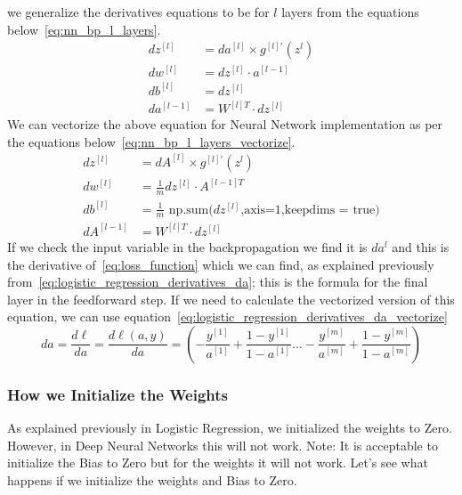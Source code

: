 we generalize the derivatives equations to be for $l$ layers from the equations below~\eqref{eq:nn_bp_l_layers}.%
%
\begin{subequations}\label{eq:nn_bp_l_layers}
  \begin{align}
   dz^{[l]} & = da^{[l]} \times g^{[l]'}(z^{l}) \\
   dw^{[l]} & = dz^{[l]} \cdot a^{[l-1]} \\
   db^{[l]} & = dz^{[l]} \\
   da^{[l-1]} & = W^{[l]T} \cdot dz^{[l]} %
 \end{align}
\end{subequations}%
We can vectorize the above equation for Neural Network implementation as per the equations below~\eqref{eq:nn_bp_l_layers_vectorize}.
 \begin{subequations}\label{eq:nn_bp_l_layers_vectorize}
  \begin{align}
   dz^{[l]} & = dA^{[l]} \times g^{[l]'}(z^{l}) \\
   dw^{[l]} & = \frac{1}{m} dz^{[l]} \cdot A^{[l-1]T} \\
   db^{[l]} & = \frac{1}{m} \text{ np.sum(}dz^{[l]}\text{,axis=1,keepdims = true)} \\
   dA^{[l-1]} & = W^{[l]T} \cdot dz^{[l]} %
 \end{align}
\end{subequations}%
%
If we check the input variable in the backpropagation we find it is $da^{l}$ and this is the derivative of~\eqref{eq:loss_function} which we can find, as explained previously from~\eqref{eq:logistic_regression_derivatives_da}; this is the formula for the final layer in the feedforward step. If we need to calculate the vectorized version of this equation, we can use equation~\eqref{eq:logistic_regression_derivatives_da_vectorize}
\begin{equation}\label{eq:logistic_regression_derivatives_da_vectorize}
da = \frac{d\ell}{da} = \frac{d\ell(a,y)}{da} = (- \frac{y^{[1]}}{a^{[1]}} + \frac{1-y^{[1]}}{1-a^{[1]}} \ldots - \frac{y^{[m]}}{a^{[m]}} + \frac{1-y^{[m]}}{1-a^{[m]}} )
\end{equation}%
%
\subsubsection{How we Initialize the Weights}
As explained previously in Logistic Regression, we initialized the weights to Zero. However, in Deep Neural Networks this will not work. Note: It is acceptable to initialize the Bias to Zero but for the weights it will not work. Let's see what happens if we initialize the weights and Bias to Zero. %
  
